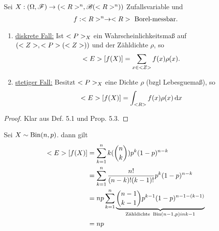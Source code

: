 \begin{proposition}
	Sei $X: (\O, \F) \to (\Rn, \borel(\Rn))$ Zufallsvariable und
	\begin{align*}
		f: \Rn \to \R \text{ Borel-messbar}.
	\end{align*}
	\begin{enumerate}
		\item \ul{diskrete Fall:} Ist $\P_X$ ein Wahrscheinlichkeitsmaß auf $(\Z, \P(\Z))$ und der Zähldichte $\rho$, so
		\begin{align*}
			\E[f(X)] = \sum_{x \in \Z} f(x)\rho(x).
		\end{align*}
		\item \ul{stetiger Fall:} Besitzt $\P_X$ eine Dichte $\rho$ (bzgl Lebesguemaß), so
		\begin{align*}
			\E[f(X)] = \int_{\R} f(x)\rho(x) \d x
		\end{align*}
	\end{enumerate}
\end{proposition}
\begin{proof}
	Klar aus Def. 5.1 und Prop. 5.3. %
\end{proof}
\begin{example}
	Sei $X \sim \Bin(n,p)$. dann gilt
	\begin{align*}
		\E[f(X)] &= \sum_{k=1}^n k(\binom{n}{k})p^k (1-p)^{n-k}\\
		&= \sum_{k=1}^n \frac{n!}{(n-k)!(k-1)!}p^k (1-p)^{n-k}\\
		&= np \sum_{k=1}^n \underbrace{\binom{n-1}{k-1}p^{k-1}(1-p)^{n-1-(k-1)}}_{\text{Zähldichte }\Bin(n-1,p) in k-1}\\
		&= np
	\end{align*}
\end{example}